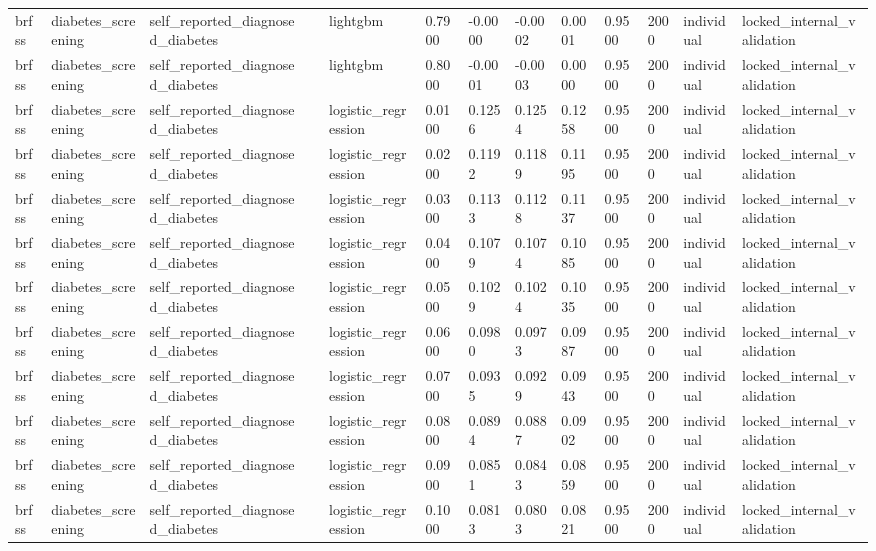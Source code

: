 \begin{tabular}{lllllllllllll}
brfss & diabetes\_screening & self\_reported\_diagnosed\_diabetes &  & lightgbm & 0.7900 & -0.0000 & -0.0002 & 0.0001 & 0.9500 & 2000 & individual & locked\_internal\_validation \\
brfss & diabetes\_screening & self\_reported\_diagnosed\_diabetes &  & lightgbm & 0.8000 & -0.0001 & -0.0003 & 0.0000 & 0.9500 & 2000 & individual & locked\_internal\_validation \\
brfss & diabetes\_screening & self\_reported\_diagnosed\_diabetes &  & logistic\_regression & 0.0100 & 0.1256 & 0.1254 & 0.1258 & 0.9500 & 2000 & individual & locked\_internal\_validation \\
brfss & diabetes\_screening & self\_reported\_diagnosed\_diabetes &  & logistic\_regression & 0.0200 & 0.1192 & 0.1189 & 0.1195 & 0.9500 & 2000 & individual & locked\_internal\_validation \\
brfss & diabetes\_screening & self\_reported\_diagnosed\_diabetes &  & logistic\_regression & 0.0300 & 0.1133 & 0.1128 & 0.1137 & 0.9500 & 2000 & individual & locked\_internal\_validation \\
brfss & diabetes\_screening & self\_reported\_diagnosed\_diabetes &  & logistic\_regression & 0.0400 & 0.1079 & 0.1074 & 0.1085 & 0.9500 & 2000 & individual & locked\_internal\_validation \\
brfss & diabetes\_screening & self\_reported\_diagnosed\_diabetes &  & logistic\_regression & 0.0500 & 0.1029 & 0.1024 & 0.1035 & 0.9500 & 2000 & individual & locked\_internal\_validation \\
brfss & diabetes\_screening & self\_reported\_diagnosed\_diabetes &  & logistic\_regression & 0.0600 & 0.0980 & 0.0973 & 0.0987 & 0.9500 & 2000 & individual & locked\_internal\_validation \\
brfss & diabetes\_screening & self\_reported\_diagnosed\_diabetes &  & logistic\_regression & 0.0700 & 0.0935 & 0.0929 & 0.0943 & 0.9500 & 2000 & individual & locked\_internal\_validation \\
brfss & diabetes\_screening & self\_reported\_diagnosed\_diabetes &  & logistic\_regression & 0.0800 & 0.0894 & 0.0887 & 0.0902 & 0.9500 & 2000 & individual & locked\_internal\_validation \\
brfss & diabetes\_screening & self\_reported\_diagnosed\_diabetes &  & logistic\_regression & 0.0900 & 0.0851 & 0.0843 & 0.0859 & 0.9500 & 2000 & individual & locked\_internal\_validation \\
brfss & diabetes\_screening & self\_reported\_diagnosed\_diabetes &  & logistic\_regression & 0.1000 & 0.0813 & 0.0803 & 0.0821 & 0.9500 & 2000 & individual & locked\_internal\_validation \\

\end{tabular}
